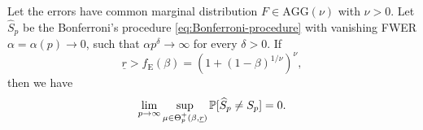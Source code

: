 \begin{theorem} \label{thm:sufficient}
Let the errors have common marginal distribution $F\in \text{AGG}(\nu)$ with $\nu>0$.
Let $\widehat{S}_p$ be the Bonferroni's procedure \eqref{eq:Bonferroni-procedure} with vanishing FWER $\alpha = \alpha(p) \to 0$, such that %
$\alpha p^\delta\to \infty$ for every $\delta>0$.
If
\begin{equation} \label{eq:signal-above-boundary}
    \underline{r} > f_{\mathrm{E}}(\beta) = (1 + (1 - \beta)^{1/\nu})^\nu,
\end{equation}
then we have
\begin{equation} \label{eq:exact-supporot-recovery}
    \lim_{p\to\infty}\sup_{\mu\in\Theta_p^+(\beta, \underline{r})} \P[\widehat{S}_p \neq S_p] = 0.
\end{equation}
\end{theorem}
